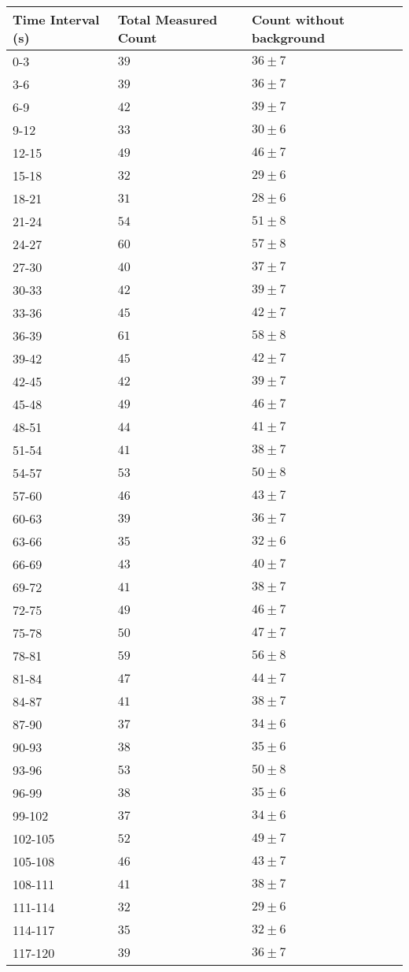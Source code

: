 \begin{tabular}{| p{} | p{} | p{} |}\hline
Time Interval (s) & Total Measured Count & Count without background\\
\hline
0-3 & $39$ & $36\pm 7$\\
3-6 & $39$ & $36\pm 7$\\
6-9 & $42$ & $39\pm 7$\\
9-12 & $33$ & $30\pm 6$\\
12-15 & $49$ & $46\pm 7$\\
15-18 & $32$ & $29\pm 6$\\
18-21 & $31$ & $28\pm 6$\\
21-24 & $54$ & $51\pm 8$\\
24-27 & $60$ & $57\pm 8$\\
27-30 & $40$ & $37\pm 7$\\
30-33 & $42$ & $39\pm 7$\\
33-36 & $45$ & $42\pm 7$\\
36-39 & $61$ & $58\pm 8$\\
39-42 & $45$ & $42\pm 7$\\
42-45 & $42$ & $39\pm 7$\\
45-48 & $49$ & $46\pm 7$\\
48-51 & $44$ & $41\pm 7$\\
51-54 & $41$ & $38\pm 7$\\
54-57 & $53$ & $50\pm 8$\\
57-60 & $46$ & $43\pm 7$\\
60-63 & $39$ & $36\pm 7$\\
63-66 & $35$ & $32\pm 6$\\
66-69 & $43$ & $40\pm 7$\\
69-72 & $41$ & $38\pm 7$\\
72-75 & $49$ & $46\pm 7$\\
75-78 & $50$ & $47\pm 7$\\
78-81 & $59$ & $56\pm 8$\\
81-84 & $47$ & $44\pm 7$\\
84-87 & $41$ & $38\pm 7$\\
87-90 & $37$ & $34\pm 6$\\
90-93 & $38$ & $35\pm 6$\\
93-96 & $53$ & $50\pm 8$\\
96-99 & $38$ & $35\pm 6$\\
99-102 & $37$ & $34\pm 6$\\
102-105 & $52$ & $49\pm 7$\\
105-108 & $46$ & $43\pm 7$\\
108-111 & $41$ & $38\pm 7$\\
111-114 & $32$ & $29\pm 6$\\
114-117 & $35$ & $32\pm 6$\\
117-120 & $39$ & $36\pm 7$\\
\hline
\end{tabular}\quad
